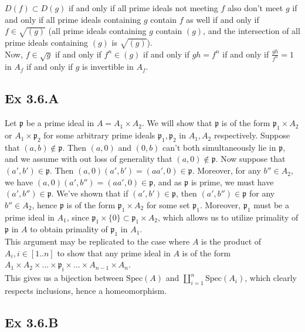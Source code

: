 \documentclass{article}
\theoremstyle{definition}
\newcommand{\Spec}{\text{Spec}}
\begin{document}
$D(f) \subset D(g)$ if and only if all prime ideals not meeting $f$ also don't
meet $g$ if and only if all prime ideals containing $g$ contain $f$ as well if
and only if $f \in \sqrt{(g)}$ (all prime ideals containing $g$ contain $(g)$,
and the intersection of all prime ideals containing $(g)$ is $\sqrt{(g)}$). \\

Now, $f \in \sqrt{g}$ if and only if $f^n \in (g)$ if and only if $gh = f^n$ if
and only if $\frac{gh}{f^n} = 1$ in $A_f$ if and only if $g$ is invertible in
$A_f$.

\subsection*{Ex 3.6.A}

Let $\mathfrak{p}$ be a prime ideal in $A = A_1 \times A_2$. We will show that
$\mathfrak{p}$ is of the form $\mathfrak{p}_1 \times A_2$ or $A_1 \times
\mathfrak{p}_2$ for some arbitrary prime ideals $\mathfrak{p}_1,
\mathfrak{p}_2$ in $A_1, A_2$ respectively. Suppose that $(a, b) \not \in
\mathfrak{p}$. Then $(a, 0)$ and $(0, b)$ can't both simultaneously lie in
$\mathfrak{p}$, and we assume with out loss of generality that $(a, 0) \not \in
\mathfrak{p}$. Now suppose that $(a', b') \in \mathfrak{p}$. Then $(a, 0)(a',
b') = (aa', 0) \in \mathfrak{p}$. Moreover, for any $b'' \in A_2$, we have $(a,
0)(a', b'') = (aa', 0) \in \mathfrak{p}$, and as $\mathfrak{p}$ is prime, we
must have $(a', b'') \in \mathfrak{p}$. We've shown that if $(a', b') \in
\mathfrak{p}$, then $(a', b'') \in \mathfrak{p}$ for any $b'' \in A_2$, hence
$\mathfrak{p}$ is of the form $\mathfrak{p}_1 \times A_2$ for some set
$\mathfrak{p}_1$. Moreover, $\mathfrak{p_1}$ must be a prime ideal in $A_1$,
since $\mathfrak{p_1} \times \{0\} \subset \mathfrak{p_1} \times A_2$, which
allows us to utilize primality of $\mathfrak{p}$ in $A$ to obtain primality of
$\mathfrak{p_1}$ in $A_1$. \\

This argument may be replicated to the case where $A$ is the product of $A_i, i
\in [1..n]$ to show that any prime ideal in $A$ is of the form $A_1 \times A_2
\times \ldots \times \mathfrak{p_j} \times \ldots \times A_{n-1} \times A_{n}$. \\

This gives us a bijection between $\Spec(A)$ and $\coprod_{i = 1}^{n}
\Spec(A_i)$, which clearly respects inclusions, hence a homeomorphism.

\subsection*{Ex 3.6.B}
\end{document}
